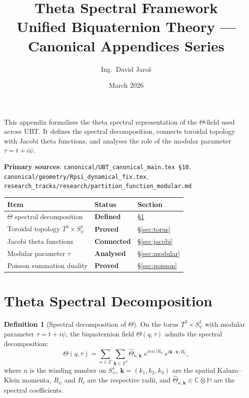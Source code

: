 \documentclass[11pt,a4paper]{article}
\title{\textbf{Theta Spectral Framework}\\
\large Unified Biquaternion Theory — Canonical Appendices Series}
\author{Ing.\ David Jaroš}
\date{March 2026}
\theoremstyle{definition}
\newtheorem{definition}[theorem]{Definition}
\theoremstyle{remark}
\begin{document}
\maketitle
\tableofcontents
\bigskip

\begin{tcolorbox}[colback=blue!4!white,colframe=blue!50!black,title=Purpose]
This appendix formalises the theta spectral representation of the
$\Theta$-field used across UBT.  It defines the spectral decomposition,
connects toroidal topology with Jacobi theta functions, and analyses the
role of the modular parameter $\tau = t + i\psi$.

\medskip
\textbf{Primary sources}:
\texttt{canonical/UBT\_canonical\_main.tex \S10},
\texttt{canonical/geometry/Rpsi\_dynamical\_fix.tex},
\texttt{research\_tracks/research/partition\_function\_modular.md}

\medskip
\begin{tabular}{lll}
\hline
Item & Status & Section \\
\hline
$\Theta$ spectral decomposition & \textbf{Defined} & \S\ref{sec:spectral_decomp} \\
Toroidal topology $T^3\times S^1_\psi$ & \textbf{Proved} & \S\ref{sec:torus} \\
Jacobi theta functions & \textbf{Connected} & \S\ref{sec:jacobi} \\
Modular parameter $\tau$ & \textbf{Analysed} & \S\ref{sec:modular} \\
Poisson summation duality & \textbf{Proved} & \S\ref{sec:poisson} \\
\hline
\end{tabular}
\end{tcolorbox}

\section{Theta Spectral Decomposition}\label{sec:spectral_decomp}

\begin{definition}[Spectral decomposition of $\Theta$]
\label{def:spectral}
On the torus $T^3 \times S^1_\psi$ with modular parameter $\tau = t + i\psi$,
the biquaternion field $\Theta(q,\tau)$ admits the spectral decomposition:
\begin{equation}\label{eq:spectral}
  \Theta(q,\tau)
  = \sum_{n \in \mathbb{Z}}\sum_{\mathbf{k}\in\mathbb{Z}^3}
    \hat{\Theta}_{n,\mathbf{k}}\;
    e^{i n\psi/R_\psi}\,
    e^{i \mathbf{k}\cdot\mathbf{x}/R_t},
\end{equation}
where $n$ is the winding number on $S^1_\psi$, $\mathbf{k} = (k_1,k_2,k_3)$
are the spatial Kaluza--Klein momenta, $R_\psi$ and $R_t$ are the respective
radii, and $\hat{\Theta}_{n,\mathbf{k}} \in \mathbb{C}\otimes\mathbb{H}$
are the spectral coefficients.
\end{definition}
\end{document}
